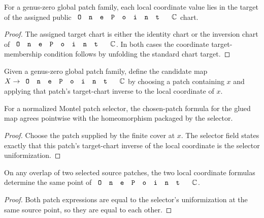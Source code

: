 \begin{lemma}
\label{lem:global-gluing-coord-mem-target}
For a genus-zero global patch family, each local coordinate value lies in the
target of the assigned public \(\code{OnePoint}\,\C\) chart.
\leanok
\end{lemma}
\begin{proof}\leanok
The assigned target chart is either the identity chart or the inversion chart
of \(\code{OnePoint}\,\C\). In both cases the coordinate target-membership
condition follows by unfolding the standard chart target.
\end{proof}

\begin{definition}
\label{def:global-gluing-to-map}
Given a genus-zero global patch family, define the candidate map
\(X\to\code{OnePoint}\,\C\) by choosing a patch containing \(x\) and applying
that patch's target-chart inverse to the local coordinate of \(x\).
\leanok
\end{definition}

\begin{lemma}
\label{lem:global-gluing-to-map-eq-uniformization}
For a normalized Montel patch selector, the chosen-patch formula for the glued
map agrees pointwise with the homeomorphism packaged by the selector.
\leanok
\end{lemma}
\begin{proof}\leanok
Choose the patch supplied by the finite cover at \(x\). The selector field
 states exactly that this patch's
target-chart inverse of the local coordinate is the selector uniformization.
\end{proof}



\begin{lemma}
\label{lem:global-gluing-overlap-compatible}
On any overlap of two selected source patches, the two local coordinate
formulas determine the same point of \(\code{OnePoint}\,\C\).
\leanok
\end{lemma}
\begin{proof}\leanok
Both patch expressions are equal to the selector's uniformization at the same
source point, so they are equal to each other.
\end{proof}

